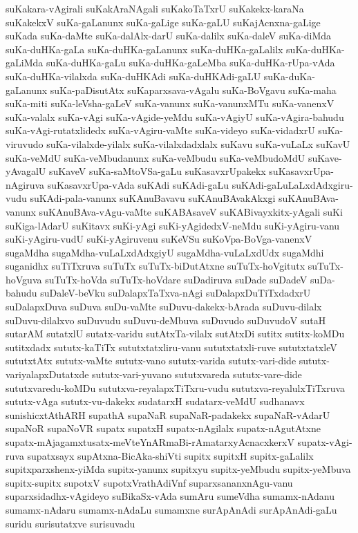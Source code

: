{suKakara-vAgirali
suKakAraNAgali
suKakoTaTxrU
suKakekx-karaNa
suKakekxV
suKa-gaLanunx
suKa-gaLige
suKa-gaLU
suKajAcnxna-gaLige
suKada
suKa-daMte
suKa-dalAlx-darU
suKa-dalilx
suKa-daleV
suKa-diMda
suKa-duHKa-gaLa
suKa-duHKa-gaLanunx
suKa-duHKa-gaLalilx
suKa-duHKa-gaLiMda
suKa-duHKa-gaLu
suKa-duHKa-gaLeMba
suKa-duHKa-rUpa-vAda
suKa-duHKa-vilalxda
suKa-duHKAdi
suKa-duHKAdi-gaLU
suKa-duKa-gaLanunx
suKa-paDisutAtx
suKaparxsava-vAgalu
suKa-BoVgavu
suKa-maha
suKa-miti
suKa-leVsha-gaLeV
suKa-vanunx
suKa-vanunxMTu
suKa-vanenxV
suKa-valalx
suKa-vAgi
suKa-vAgide-yeMdu
suKa-vAgiyU
suKa-vAgira-bahudu
suKa-vAgi-rutatxlidedx
suKa-vAgiru-vaMte
suKa-videyo
suKa-vidadxrU
suKa-viruvudo
suKa-vilalxde-yilalx
suKa-vilalxdadxlalx
suKavu
suKa-vuLaLx
suKavU
suKa-veMdU
suKa-veMbudanunx
suKa-veMbudu
suKa-veMbudoMdU
suKave-yAvagalU
suKaveV
suKa-saMtoVSa-gaLu
suKasavxrUpakekx
suKasavxrUpa-nAgiruva
suKasavxrUpa-vAda
suKAdi
suKAdi-gaLu
suKAdi-gaLuLaLxdAdxgiru-vudu
suKAdi-pala-vanunx
suKAnuBavavu
suKAnuBAvakAkxgi
suKAnuBAva-vanunx
suKAnuBAva-vAgu-vaMte
suKABAsaveV
suKABivayxkitx-yAgali
suKi
suKiga-lAdarU
suKitavx
suKi-yAgi
suKi-yAgidedxV-neMdu
suKi-yAgiru-vanu
suKi-yAgiru-vudU
suKi-yAgiruvenu
suKeVSu
suKoVpa-BoVga-vanenxV
sugaMdha
sugaMdha-vuLaLxdAdxgiyU
sugaMdha-vuLaLxdUdx
sugaMdhi
suganidhx
suTiTxruva
suTuTx
suTuTx-biDutAtxne
suTuTx-hoVgitutx
suTuTx-hoVguva
suTuTx-hoVda
suTuTx-hoVdare
suDadiruva
suDade
suDadeV
suDa-bahudu
suDaleV-beVku
suDalapxTaTxva-nAgi
suDalapxDuTiTxdadxrU
suDalapxDuva
suDuva
suDu-vaMte
suDuvu-dakekx-bArada
suDuvu-dilalx
suDuvu-dilalxvo
suDuvudu
suDuvu-deMbuva
suDuvudo
suDuvudoV
sutaH
sutarAM
sutatxlU
sutatx-varidu
sutAtxTa-vilalx
sutAtxDi
sutitx
sutitx-koMDu
sutitxdadx
sututx-kaTiTx
sututxtatxliru-vanu
sututxtatxli-ruve
sututxtatxleV
sututxtAtx
sututx-vaMte
sututx-vano
sututx-varida
sututx-vari-dide
sututx-variyalapxDutatxde
sututx-vari-yuvano
sututxvareda
sututx-vare-dide
sututxvaredu-koMDu
sututxva-reyalapxTiTxru-vudu
sututxva-reyalulxTiTxruva
sututx-vAga
sututx-vu-dakekx
sudatarxH
sudatarx-veMdU
sudhanavx
sunishicxtAthARH
supathA
supaNaR
supaNaR-padakekx
supaNaR-vAdarU
supaNoR
supaNoVR
supatx
supatxH
supatx-nAgilalx
supatx-nAgutAtxne
supatx-mAjagamxtusatx-meVteYnARmaBi-rAmatarxyAcnacxkerxV
supatx-vAgi-ruva
supatxsayx
supAtxna-BicAka-shiVti
supitx
supitxH
supitx-gaLalilx
supitxparxshenx-yiMda
supitx-yanunx
supitxyu
supitx-yeMbudu
supitx-yeMbuva
supitx-supitx
supotxV
supotxVrathAdiVnf
suparxsananxnAgu-vanu
suparxsidadhx-vAgideyo
suBikaSx-vAda
sumAru
sumeVdha
sumamx-nAdanu
sumamx-nAdaru
sumamx-nAdaLu
sumamxne
surApAnAdi
surApAnAdi-gaLu
suridu
surisutatxve
surisuvadu
}
